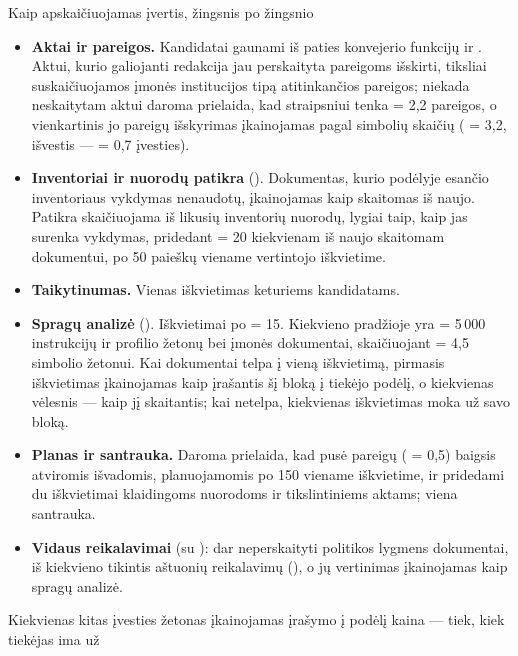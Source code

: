 \begin{codebox}{Kaip apskaičiuojamas įvertis, žingsnis po žingsnio}
\begin{itemize}
  \item \textbf{Aktai ir pareigos.} Kandidatai gaunami iš paties konvejerio funkcijų
     ir . Aktui, kurio galiojanti redakcija jau
    perskaityta pareigoms išskirti, tiksliai suskaičiuojamos įmonės institucijos tipą
    atitinkančios pareigos; niekada neskaitytam aktui daroma prielaida, kad straipsniui tenka
     = 2,2 pareigos, o vienkartinis jo pareigų išskyrimas
    įkainojamas pagal simbolių skaičių ( = 3,2, išvestis ---
     = 0,7 įvesties).
  \item \textbf{Inventoriai ir nuorodų patikra} (). Dokumentas, kurio
    podėlyje esančio inventoriaus vykdymas nenaudotų, įkainojamas kaip skaitomas iš naujo.
    Patikra skaičiuojama iš likusių inventorių nuorodų, lygiai taip, kaip jas surenka
    vykdymas, pridedant  = 20 kiekvienam iš naujo skaitomam
    dokumentui, po 50 paieškų viename vertintojo iškvietime.
  \item \textbf{Taikytinumas.} Vienas iškvietimas keturiems kandidatams.
  \item \textbf{Spragų analizė} (). Iškvietimai po
     = 15. Kiekvieno pradžioje yra  = 5\,000
    instrukcijų ir profilio žetonų bei įmonės dokumentai, skaičiuojant
     = 4,5 simbolio žetonui. Kai dokumentai telpa į vieną
    iškvietimą, pirmasis iškvietimas įkainojamas kaip įrašantis šį bloką į tiekėjo podėlį, o
    kiekvienas vėlesnis --- kaip jį skaitantis; kai netelpa, kiekvienas iškvietimas moka už
    savo bloką.
  \item \textbf{Planas ir santrauka.} Daroma prielaida, kad pusė pareigų ( =
    0,5) baigsis atviromis išvadomis, planuojamomis po 150 viename iškvietime, ir pridedami du
    iškvietimai klaidingoms nuorodoms ir tikslintiniems aktams; viena santrauka.
  \item \textbf{Vidaus reikalavimai} (su ): dar neperskaityti politikos
    lygmens dokumentai, iš kiekvieno tikintis aštuonių reikalavimų
    (), o jų vertinimas įkainojamas kaip spragų analizė.
\end{itemize}
Kiekvienas kitas įvesties žetonas įkainojamas įrašymo į podėlį kaina --- tiek, kiek tiekėjas ima už

\end{codebox}
